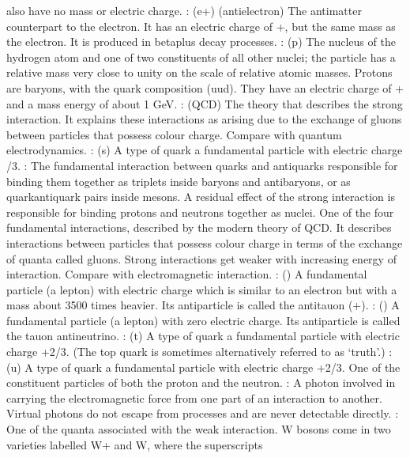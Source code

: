 \documentclass[letterpaper,10pt,english]{sphinxmanual}
\begin{document}
also have no mass or electric charge. : (e+) (antielectron) The antimatter counterpart to the electron. It has an electric charge of +, but the same mass as the electron. It is produced in beta\sphinxhyphen{}plus decay processes. : (p) The nucleus of the hydrogen atom and one of two constituents of all other nuclei; the particle has a relative mass very close to unity on the scale of relative atomic masses. Protons are baryons, with the quark composition (uud). They have an electric
charge of + and a mass energy of about 1 GeV. : (QCD) The theory that describes the strong interaction. It explains these interactions as arising due to the exchange of gluons between particles that possess colour charge. Compare with quantum electrodynamics. : (s) A type of quark \sphinxhyphen{} a fundamental particle with electric charge \textendash{}/3. : The fundamental interaction between quarks and antiquarks responsible for binding them together as
triplets inside baryons and antibaryons, or as quark\textendash{}antiquark pairs inside mesons. A residual effect of the strong interaction is responsible for binding protons and neutrons together as nuclei. One of the four fundamental interactions, described by the modern theory of QCD. It describes interactions between particles that possess colour charge in terms of the exchange of quanta called gluons. Strong interactions get weaker with increasing energy of interaction. Compare with electromagnetic
interaction. : (\sphinxhyphen{}) A fundamental particle (a lepton) with electric charge \textendash{} which is similar to an electron but with a mass about 3500 times heavier. Its antiparticle is called the antitauon (+). : () A fundamental particle (a lepton) with zero electric charge. Its antiparticle is called the tauon antineutrino. : (t) A type of quark \sphinxhyphen{} a fundamental particle with electric charge +2/3. (The top quark is sometimes alternatively referred to as ‘truth’.)
: (u) A type of quark \sphinxhyphen{} a fundamental particle with electric charge +2/3. One of the constituent particles of both the proton and the neutron. : A photon involved in carrying the electromagnetic force from one part of an interaction to another. Virtual photons do not escape from processes and are never detectable directly. : One of the quanta associated with the weak interaction. W bosons come in two varieties labelled W+ and W\sphinxhyphen{}, where the superscripts
\end{document}
